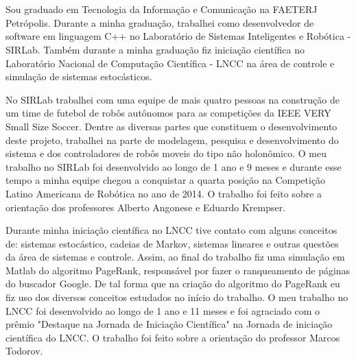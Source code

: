 \documentclass[a4paper]{report} %
\begin{document}
\section*{}
\vspace{-1.3cm}
\subsection*{}

\vspace{1cm}

Sou graduado em Tecnologia da Informação e Comunicação na FAETERJ Petrópolis. Durante a minha graduação, trabalhei como desenvolvedor de software em linguagem C++ no Laboratório de Sistemas Inteligentes e Robótica - SIRLab. Também durante a minha graduação fiz iniciação científica no Laboratório Nacional de Computação Científica - LNCC na área de controle e simulação de sistemas estocásticos. 

No SIRLab trabalhei com uma equipe de mais quatro pessoas na construção de um time de futebol de robôs autônomos para as competições da IEEE VERY Small Size Soccer. Dentre as diversas partes que constituem o desenvolvimento deste projeto, trabalhei na parte de modelagem, pesquisa e desenvolvimento do sistema e dos controladores de robôs moveis do tipo não holonômico. O meu trabalho no SIRLab foi desenvolvido ao longo de 1 ano e 9 meses e durante esse tempo a minha equipe chegou a conquistar a quarta posição na Competição Latino Americana de Robótica no ano de 2014. O trabalho foi feito sobre a orientação dos professores Alberto Angonese e Eduardo Krempser.

Durante minha iniciação científica no LNCC tive contato com alguns conceitos de: sistemas estocástico, cadeias de Markov, sistemas lineares e outras questões da área de sistemas e controle. Assim, ao final do trabalho fiz uma simulação em Matlab do algoritmo PageRank, responsável por fazer o ranqueamento de páginas do buscador Google. De tal forma que na criação do algoritmo do PageRank eu fiz uso dos diversos conceitos estudados no início do trabalho. O meu trabalho no LNCC foi desenvolvido ao longo de 1 ano e 11 meses e foi agraciado com o prêmio "Destaque na Jornada de Iniciação Científica" na Jornada de iniciação científica do LNCC. O trabalho foi feito sobre a orientação do professor Marcos Todorov.

\end{document}
